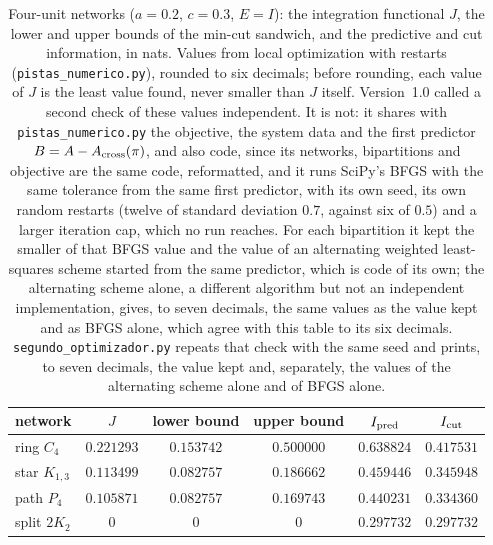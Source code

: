 \begin{table}[htbp]\centering\small
\begin{tabular}{lccccc}
\toprule
network & $J$ & lower bound & upper bound & $I_{\rm pred}$ & $I_{\rm cut}$\\
\midrule
ring $C_4$ & $0.221293$ & $0.153742$ & $0.500000$ & $0.638824$ & $0.417531$\\
star $K_{1,3}$ & $0.113499$ & $0.082757$ & $0.186662$ & $0.459446$ & $0.345948$\\
path $P_4$ & $0.105871$ & $0.082757$ & $0.169743$ & $0.440231$ & $0.334360$\\
split $2K_2$ & $0$ & $0$ & $0$ & $0.297732$ & $0.297732$\\
\bottomrule
\end{tabular}
\caption{Four-unit networks ($a=0.2$, $c=0.3$, $E=I$): the integration functional $J$, the lower and upper bounds of the min-cut sandwich, and the predictive and cut information, in nats. Values from local optimization with restarts (\texttt{pistas\_numerico.py}), rounded to six decimals; before rounding, each value of $J$ is the least value found, never smaller than $J$ itself. Version~1.0 called a second check of these values independent. It is not: it shares with \texttt{pistas\_numerico.py} the objective, the system data and the first predictor $B=A-A_{\rm cross}(\pi)$, and also code, since its networks, bipartitions and objective are the same code, reformatted, and it runs SciPy's BFGS with the same tolerance from the same first predictor, with its own seed, its own random restarts (twelve of standard deviation $0.7$, against six of $0.5$) and a larger iteration cap, which no run reaches. For each bipartition it kept the smaller of that BFGS value and the value of an alternating weighted least-squares scheme started from the same predictor, which is code of its own; the alternating scheme alone, a different algorithm but not an independent implementation, gives, to seven decimals, the same values as the value kept and as BFGS alone, which agree with this table to its six decimals. \texttt{segundo\_optimizador.py} repeats that check with the same seed and prints, to seven decimals, the value kept and, separately, the values of the alternating scheme alone and of BFGS alone. \stN}
\label{tab:networks}
\end{table}

